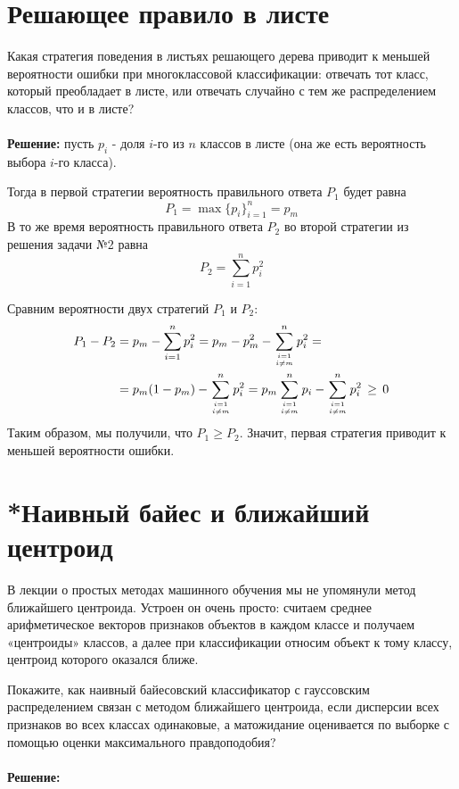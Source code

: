 \documentclass[a4paper]{article}
\begin{document}
\section{Решающее правило в листе}
Какая стратегия поведения в листьях решающего дерева приводит к меньшей вероятности ошибки при многоклассовой классификации: отвечать тот класс, который преобладает в листе, или отвечать случайно с тем же распределением классов, что и в листе?
\\ \\
\textbf{Решение:} пусть $p_i$ - доля $i$-го из $n$ классов в листе (она же есть вероятность выбора $i$-го класса).

Тогда в первой стратегии вероятность правильного ответа $P_1$ будет равна
$$
P_1 = \max\{p_i\}_{i = 1}^n = p_{m}
$$
В то же время вероятность правильного ответа $P_2$ во второй стратегии из решения задачи №2 равна
$$
P_2 = \sum\limits_{i = 1}^n p_i^2
$$

Сравним вероятности двух стратегий $P_1$ и $P_2$:
\begin{align*}
    P_1 - P_2 &= p_m - \sum\limits_{i = 1}^n p_i^2 = p_m - p_m^2 - \sum\limits_{{i = 1}\atop{i \neq m}}^n p_i^2 = \\
    &= p_m(1 - p_m) - \sum\limits_{{i = 1}\atop{i \neq m}}^n p_i^2 = p_m\sum\limits_{{i = 1}\atop{i \neq m}}^n p_i - \sum\limits_{{i = 1}\atop{i \neq m}}^n p_i^2 \,\geq\, 0
\end{align*}
Таким образом, мы получили, что $P_1 \geq P_2$. Значит, первая стратегия приводит к меньшей вероятности ошибки.
\pagebreak

\section{*Наивный байес и ближайший центроид}
В лекции о простых методах машинного обучения мы не упомянули метод ближайшего центроида. Устроен он очень просто: считаем среднее арифметическое векторов признаков объектов в каждом классе и получаем «центроиды» классов, а далее при классификации относим объект к тому классу, центроид которого оказался ближе.

Покажите, как наивный байесовский классификатор с гауссовским распределением связан с методом ближайшего центроида, если дисперсии всех признаков во всех классах одинаковые, а матожидание оценивается по выборке с помощью оценки максимального правдоподобия?
\\ \\
\textbf{Решение:}
\pagebreak
\end{document}
